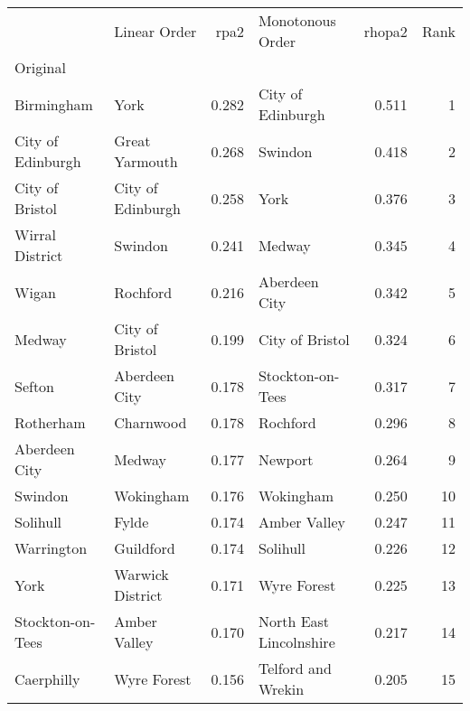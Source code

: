 \begin{tabular}{llrlrr}
\toprule
{} &               Linear Order &   rpa2 &           Monotonous Order &  rhopa2 &  Rank \\
Original                  &                            &        &                            &         &       \\
\midrule
Birmingham                &                       York &  0.282 &          City of Edinburgh &   0.511 &     1 \\
City of Edinburgh         &             Great Yarmouth &  0.268 &                    Swindon &   0.418 &     2 \\
City of Bristol           &          City of Edinburgh &  0.258 &                       York &   0.376 &     3 \\
Wirral District           &                    Swindon &  0.241 &                     Medway &   0.345 &     4 \\
Wigan                     &                   Rochford &  0.216 &              Aberdeen City &   0.342 &     5 \\
Medway                    &            City of Bristol &  0.199 &            City of Bristol &   0.324 &     6 \\
Sefton                    &              Aberdeen City &  0.178 &           Stockton-on-Tees &   0.317 &     7 \\
Rotherham                 &                  Charnwood &  0.178 &                   Rochford &   0.296 &     8 \\
Aberdeen City             &                     Medway &  0.177 &                    Newport &   0.264 &     9 \\
Swindon                   &                  Wokingham &  0.176 &                  Wokingham &   0.250 &    10 \\
Solihull                  &                      Fylde &  0.174 &               Amber Valley &   0.247 &    11 \\
Warrington                &                  Guildford &  0.174 &                   Solihull &   0.226 &    12 \\
York                      &           Warwick District &  0.171 &                Wyre Forest &   0.225 &    13 \\
Stockton-on-Tees          &               Amber Valley &  0.170 &    North East Lincolnshire &   0.217 &    14 \\
Caerphilly                &                Wyre Forest &  0.156 &         Telford and Wrekin &   0.205 &    15 \\

\end{tabular}
